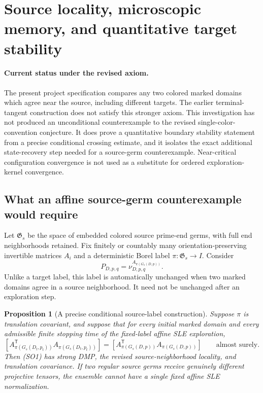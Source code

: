 \documentclass[11pt]{article}
\newtheorem{proposition}[theorem]{Proposition}
\theoremstyle{definition}\newtheorem{definition}[theorem]{Definition}
\theoremstyle{remark}\newtheorem{remark}[theorem]{Remark}
\begin{document}
\section{Source locality, microscopic memory, and quantitative target stability}
\label{sec:strong-local-obstructions}

\paragraph{Current status under the revised axiom.}
The present project specification compares any two colored marked domains
which agree near the source, including different targets.  The earlier
terminal-tangent construction does not satisfy this stronger axiom.  This
investigation has not produced an unconditional counterexample to the revised
single-color-convention conjecture.  It does prove a quantitative boundary
stability statement from a precise conditional crossing estimate, and it
isolates the exact additional state-recovery step needed for a source-germ
counterexample.  Near-critical configuration convergence is not used as a
substitute for ordered exploration-kernel convergence.

\subsection{What an affine source-germ counterexample would require}

Let $\mathfrak G_s$ be the space of embedded colored source prime-end germs,
with full end neighborhoods retained.  Fix finitely or countably many
orientation-preserving invertible matrices $A_i$ and a deterministic Borel
label $\pi:\mathfrak G_s\to I$.  Consider
\[
 P_{D,p,q}=\nu^{A_{\pi(G_s(D,p))}}_{D,p,q}.
 \tag{SO1}
\]
Unlike a target label, this label is automatically unchanged when two marked
domains agree in a source neighborhood.  It need not be unchanged after an
exploration step.

\begin{proposition}[A precise conditional source-label construction]
Suppose $\pi$ is translation covariant, and suppose that for every initial
marked domain and every admissible finite stopping time of the fixed-label
affine SLE exploration,
\[
 [A_{\pi(G_s(D_t,p_t))}^{\mathsf T}A_{\pi(G_s(D_t,p_t))}]
 =[A_{\pi(G_s(D,p))}^{\mathsf T}A_{\pi(G_s(D,p))}]
 \qquad\text{almost surely}.
 \tag{SO2}
\]
Then (SO1) has strong DMP, the revised source-neighborhood locality, and
translation covariance.  If two regular source germs receive genuinely
different projective tensors, the ensemble cannot have a single fixed affine
SLE normalization.
\end{proposition}
\end{document}
